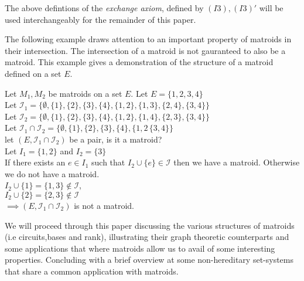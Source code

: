\documentclass[../main.tex]{subfiles}
\begin{document}
\begin{note}
The above defintions of the \textit{exchange axiom}, defined by $(I3), (I3)'$ will be used interchangeably for the remainder of this paper.
\end{note}

The following example draws attention to an important property of matroids in their intersection. The intersection of a matroid is not gauranteed to also be a matroid. This example gives a demonstration of the structure of a matroid defined on a set $E.$
\begin{exmp}
Let $M_1, M_2$ be matroids on a set $E.$ Let $E=\{1,2,3,4\}$\\
\noindent Let $\mathcal{I}_1 = \{\emptyset, \{1\},\{2\},\{3\},\{4\},\{1,2\},\{1,3\},\{2,4\},\{3,4\}\}$\\
\noindent Let $\mathcal{I}_2 = \{\emptyset, \{1\},\{2\},\{3\},\{4\},\{1,2\},\{1,4\},\{2,3\},\{3,4\}\}$\\
\noindent Let $\mathcal{I}_1 \cap \mathcal{I}_2 = \{\emptyset, \{1\},\{2\},\{3\},\{4\},\{1,2\,\{3,4\}\}$\\
let $(E, \mathcal{I}_1 \cap \mathcal{I}_2)$ be a pair, is it a matroid?\\
Let $I_1 = \{1,2\}$ and $I_2=\{3\}$\\
If there exists an $e \in I_1$ such that $I_2 \cup \{e\} \in \mathcal{I}$ then we have a matroid. Otherwise we do not have a matroid.\\
$I_2 \cup \{1\} = \{1,3\} \notin \mathcal{I}$,\\
$I_2 \cup \{2\} = \{2,3\} \notin \mathcal{I}$\\
\noindent $\implies (E, \mathcal{I}_1 \cap \mathcal{I}_2)$ is not a matroid.
\end{exmp}
\noindent We will proceed through this paper discussing the various structures of matroids (i.e circuits,bases and rank), illustrating their graph theoretic counterparts and some applications that where matroids allow us to avail of some interesting properties. Concluding with a brief overview at some non-hereditary set-systems that share a common application with matroids.
\end{document}
